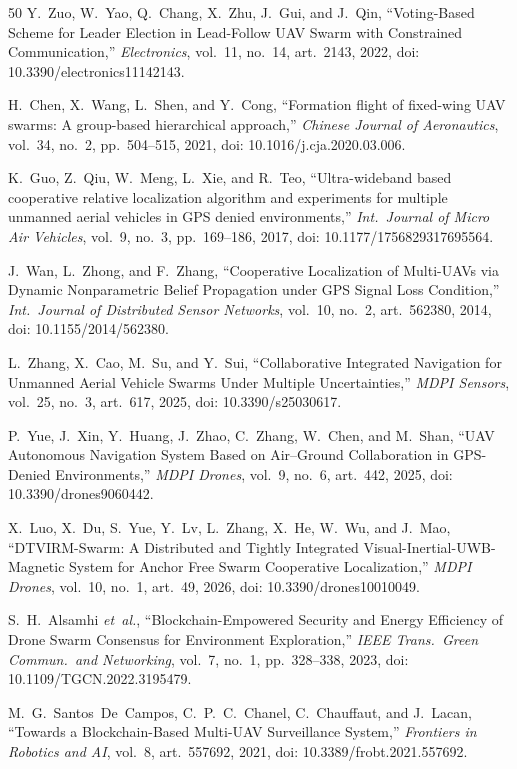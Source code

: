 \documentclass[conference,10pt]{IEEEtran}
\begin{document}
\begin{thebibliography}{50}
Y.~Zuo, W.~Yao, Q.~Chang, X.~Zhu, J.~Gui, and J.~Qin,
``Voting-Based Scheme for Leader Election in Lead-Follow UAV Swarm with Constrained Communication,''
\emph{Electronics}, vol.~11, no.~14, art.~2143, 2022,
doi: 10.3390/electronics11142143.

H.~Chen, X.~Wang, L.~Shen, and Y.~Cong,
``Formation flight of fixed-wing UAV swarms: A group-based hierarchical approach,''
\emph{Chinese Journal of Aeronautics}, vol.~34, no.~2, pp.~504--515, 2021,
doi: 10.1016/j.cja.2020.03.006.

K.~Guo, Z.~Qiu, W.~Meng, L.~Xie, and R.~Teo,
``Ultra-wideband based cooperative relative localization algorithm and experiments for multiple unmanned aerial vehicles in GPS denied environments,''
\emph{Int.\ Journal of Micro Air Vehicles}, vol.~9, no.~3, pp.~169--186, 2017,
doi: 10.1177/1756829317695564.

J.~Wan, L.~Zhong, and F.~Zhang,
``Cooperative Localization of Multi-UAVs via Dynamic Nonparametric Belief Propagation under GPS Signal Loss Condition,''
\emph{Int.\ Journal of Distributed Sensor Networks}, vol.~10, no.~2, art.~562380, 2014,
doi: 10.1155/2014/562380.

L.~Zhang, X.~Cao, M.~Su, and Y.~Sui,
``Collaborative Integrated Navigation for Unmanned Aerial Vehicle Swarms Under Multiple Uncertainties,''
\emph{MDPI Sensors}, vol.~25, no.~3, art.~617, 2025,
doi: 10.3390/s25030617.

P.~Yue, J.~Xin, Y.~Huang, J.~Zhao, C.~Zhang, W.~Chen, and M.~Shan,
``UAV Autonomous Navigation System Based on Air--Ground Collaboration in GPS-Denied Environments,''
\emph{MDPI Drones}, vol.~9, no.~6, art.~442, 2025,
doi: 10.3390/drones9060442.

X.~Luo, X.~Du, S.~Yue, Y.~Lv, L.~Zhang, X.~He, W.~Wu, and J.~Mao,
``DTVIRM-Swarm: A Distributed and Tightly Integrated Visual-Inertial-UWB-Magnetic System for Anchor Free Swarm Cooperative Localization,''
\emph{MDPI Drones}, vol.~10, no.~1, art.~49, 2026,
doi: 10.3390/drones10010049.

S.~H.~Alsamhi \emph{et~al.},
``Blockchain-Empowered Security and Energy Efficiency of Drone Swarm Consensus for Environment Exploration,''
\emph{IEEE Trans.\ Green Commun.\ and Networking}, vol.~7, no.~1, pp.~328--338, 2023,
doi: 10.1109/TGCN.2022.3195479.

M.~G.~Santos~De~Campos, C.~P.~C.~Chanel, C.~Chauffaut, and J.~Lacan,
``Towards a Blockchain-Based Multi-UAV Surveillance System,''
\emph{Frontiers in Robotics and AI}, vol.~8, art.~557692, 2021,
doi: 10.3389/frobt.2021.557692.


\end{thebibliography}
\end{document}
